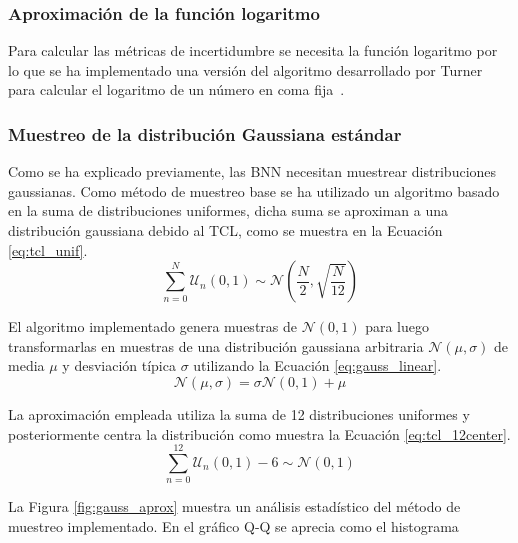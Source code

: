 \subsubsection{Aproximación de la función logaritmo}

Para calcular las métricas de incertidumbre se necesita la función logaritmo por lo que se ha implementado una versión del algoritmo desarrollado por Turner para calcular el logaritmo de un número en coma fija~\cite{binary_log}.

\subsubsection{Muestreo de la distribución Gaussiana estándar}

Como se ha explicado previamente, las BNN necesitan muestrear distribuciones gaussianas. Como método de muestreo base se ha utilizado un algoritmo basado en la suma de distribuciones uniformes, dicha suma se aproximan a una distribución gaussiana debido al TCL, como se muestra en la Ecuación \ref{eq:tcl_unif}.
\begin{equation} \label{eq:tcl_unif}
\sum_{n=0}^{N} \mathcal{U}_n(0,1) \sim \mathcal{N} \left( \dfrac{N}{2}, \sqrt{\dfrac{N}{12}} \right)
\end{equation}

El algoritmo implementado genera muestras de $\mathcal{N}(0,1)$ para luego transformarlas en muestras de una distribución gaussiana arbitraria $\mathcal{N}(\mu, \sigma)$ de media $\mu$ y desviación típica $\sigma$ utilizando la Ecuación \ref{eq:gauss_linear}.
\begin{equation} \label{eq:gauss_linear}
\mathcal{N}(\mu, \sigma) = \sigma \mathcal{N}(0,1) + \mu
\end{equation}

La aproximación empleada utiliza la suma de 12 distribuciones uniformes y posteriormente centra la distribución como muestra la Ecuación \ref{eq:tcl_12center}.
\begin{equation} \label{eq:tcl_12center}
\sum_{n=0}^{12} \mathcal{U}_n(0,1) - 6 \sim \mathcal{N}(0,1)
\end{equation}

La Figura \ref{fig:gauss_aprox} muestra un análisis estadístico del método de muestreo implementado. En el gráfico Q-Q se aprecia como el histograma \todo


